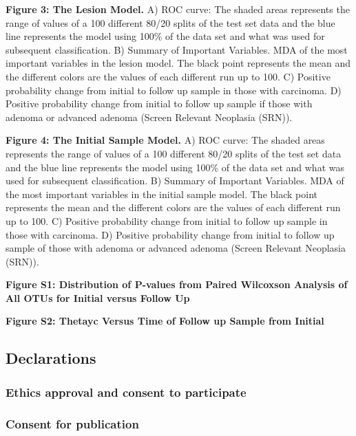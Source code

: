 \documentclass[12pt,]{article}
\begin{document}
\textbf{Figure 3: The Lesion Model.} A) ROC curve: The shaded areas
represents the range of values of a 100 different 80/20 splits of the
test set data and the blue line represents the model using 100\% of the
data set and what was used for subsequent classification. B) Summary of
Important Variables. MDA of the most important variables in the lesion
model. The black point represents the mean and the different colors are
the values of each different run up to 100. C) Positive probability
change from initial to follow up sample in those with carcinoma. D)
Positive probability change from initial to follow up sample if those
with adenoma or advanced adenoma (Screen Relevant Neoplasia (SRN)).

\textbf{Figure 4: The Initial Sample Model.} A) ROC curve: The shaded
areas represents the range of values of a 100 different 80/20 splits of
the test set data and the blue line represents the model using 100\% of
the data set and what was used for subsequent classification. B) Summary
of Important Variables. MDA of the most important variables in the
initial sample model. The black point represents the mean and the
different colors are the values of each different run up to 100. C)
Positive probability change from initial to follow up sample in those
with carcinoma. D) Positive probability change from initial to follow up
sample of those with adenoma or advanced adenoma (Screen Relevant
Neoplasia (SRN)).

\newpage

\textbf{Figure S1: Distribution of P-values from Paired Wilcoxson
Analysis of All OTUs for Initial versus Follow Up}

\textbf{Figure S2: Thetayc Versus Time of Follow up Sample from Initial}

\newpage

\subsection{Declarations}\label{declarations}

\subsubsection{Ethics approval and consent to
participate}\label{ethics-approval-and-consent-to-participate}

\subsubsection{Consent for publication}\label{consent-for-publication}
\end{document}
